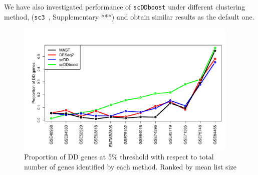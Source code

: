 \documentclass[aoas,preprint]{imsart}
\begin{document}
We have also investigated performance of \verb+scDDboost+ under different clustering 
method, (\verb+sc3+~\citep{sc3}, Supplementary ***)  and obtain similar results as the default one.

\begin{figure}[H]
\includegraphics[width = 0.95\textwidth]{Figs/DD95.pdf}
 \caption{ Proportion of DD genes at 5\% threshold with respect to total number of genes identified by each method. Ranked by mean list size }
  \label{fig:6}
\end{figure}
\end{document}
